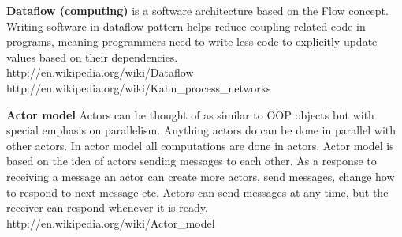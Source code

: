 \textbf{Dataflow (computing)} is a software architecture based on the Flow concept. Writing software in dataflow pattern helps reduce coupling related code in programs, meaning programmers need to write less code to explicitly update values based on their dependencies.\\http://en.wikipedia.org/wiki/Dataflow\\http://en.wikipedia.org/wiki/Kahn\_process\_networks

\textbf{Actor model} Actors can be thought of as similar to OOP objects but with special emphasis on parallelism. Anything actors do can be done in parallel with other actors. In actor model all computations are done in actors. Actor model is based on the idea of actors sending messages to each other. As a response to receiving a message an actor can create more actors, send messages, change how to respond to next message etc. Actors can send messages at any time, but the receiver can respond whenever it is ready.\\http://en.wikipedia.org/wiki/Actor\_model